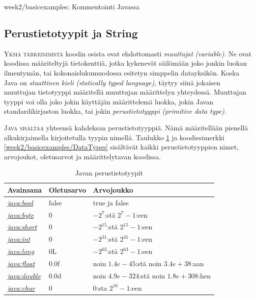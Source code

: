 \documentclass[openany]{book}
\newcommand{\newthought}[1]{\smallskip\textsc{#1}}
\newcommand{\eng}[1]{\textit{(#1)}}
\newcommand{\new}[1]{\textit{\gls{#1}}}
\newcommand{\neweng}[2]{\new{#1} \eng{#2}}
\newcommand{\java}[1]{\underline{\gls{java:#1}}}
\newcommand{\newjava}[1]{\textit{\java{#1}}}
\newcommand{\code}[3]{
	\begin{listing}
		\linespread{0.85}
		\inputminted{java}{OhjelmointiopasEsimerkit/src/#1/#2.java}
		\caption{#1: #3}
		\label{#1/#2}
	\end{listing}
}
\begin{document}
\code{week2/basicexamples}{Commenting}{Kommentointi Javassa}

\subsection{Perustietotyypit ja String}
\label{tietotyypit}

\newthought{Yksiä tärkeimmistä} koodin osista ovat ehdottomasti \textit{\gls{muuttuja}t}
\eng{variable}. Ne ovat koodissa määriteltyjä tietokenttiä, jotka kykenevät säilömään joko jonkin
luokan ilmentymän, tai kokonaislukumuodossa esitetyn simppelin datayksikön. Koska Java on 
\neweng{staattinen kieli}{statically typed language}, täytyy siinä jokaisen muuttujan tietotyyppi
määritellä muuttujan määrittelyn yhteydessä. Muuttujan tyyppi voi olla joko jokin käyttäjän
määrittelemä luokka, jokin Javan standardikirjaston luokka, tai jokin
\neweng{perustietotyyppi}{primitive data type}.

\newthought{Java sisältää} yhteensä kahdeksan perustietotyyppiä. Nämä määritellään pienellä
alkukirjaimella kirjoitetulla tyypin nimellä. Taulukko \ref{perustietotyypit} ja koodiesimerkki
\ref{week2/basicexamples/DataTypes} sisältävät kaikki perustietotyyppien nimet, arvojoukot,
oletusarvot ja määrittelytavan koodissa.

\bigskip
\begin{table}
\begin{center}
\footnotesize
\begin{tabular}{lll}
\toprule
Avainsana & Oletusarvo & Arvojoukko \\
\midrule
\newjava{bool} & false & true ja false \\
\addlinespace
\newjava{byte} & 0 & $-2^7$:stä $2^7-1$:een \\
\addlinespace
\newjava{short} & 0 & $-2^{15}$:stä $2^{15}-1$:een \\
\addlinespace
\newjava{int} & 0 & $-2^{31}$:stä $2^{31}-1$:een \\
\addlinespace
\newjava{long} & 0L & $-2^{63}$:stä $2^{63}-1$:een \\
\addlinespace
\newjava{float} & 0.0f & noin $1.4e-45$:stä noin $3.4e+38$:aan \\
\addlinespace
\newjava{double} & 0.0d & noin $4.9e-324$:stä noin $1.8e+308$:hen \\
\addlinespace
\newjava{char} & 0 & $0$:sta $2^{16}-1$:een \\
\bottomrule
\end{tabular}
\end{center}
\caption{Javan perustietotyypit}
\label{perustietotyypit}
\end{table}
\end{document}
